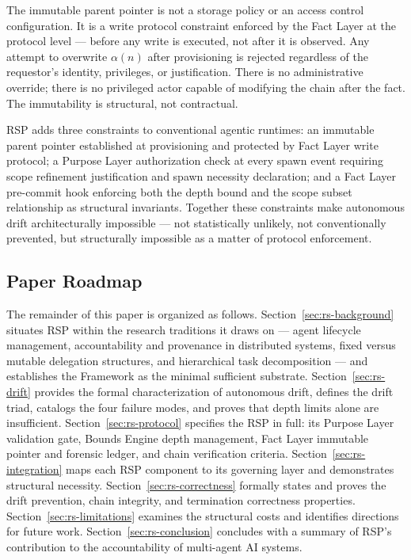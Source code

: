 The immutable parent pointer is not a storage policy or an access control configuration. It is a write protocol constraint enforced by the Fact Layer at the protocol level — before any write is executed, not after it is observed. Any attempt to overwrite $\alpha(n)$ after provisioning is rejected regardless of the requestor's identity, privileges, or justification. There is no administrative override; there is no privileged actor capable of modifying the chain after the fact. The immutability is structural, not contractual.

RSP adds three constraints to conventional agentic runtimes: an immutable parent pointer established at provisioning and protected by Fact Layer write protocol; a Purpose Layer authorization check at every spawn event requiring scope refinement justification and spawn necessity declaration; and a Fact Layer pre-commit hook enforcing both the depth bound and the scope subset relationship as structural invariants. Together these constraints make autonomous drift architecturally impossible — not statistically unlikely, not conventionally prevented, but structurally impossible as a matter of protocol enforcement.

\subsection{Paper Roadmap}

The remainder of this paper is organized as follows. Section~\ref{sec:rs-background} situates RSP within the research traditions it draws on — agent lifecycle management, accountability and provenance in distributed systems, fixed versus mutable delegation structures, and hierarchical task decomposition — and establishes the \bxthree{} Framework as the minimal sufficient substrate. Section~\ref{sec:rs-drift} provides the formal characterization of autonomous drift, defines the drift triad, catalogs the four failure modes, and proves that depth limits alone are insufficient. Section~\ref{sec:rs-protocol} specifies the RSP in full: its Purpose Layer validation gate, Bounds Engine depth management, Fact Layer immutable pointer and forensic ledger, and chain verification criteria. Section~\ref{sec:rs-integration} maps each RSP component to its governing \bxthree{} layer and demonstrates structural necessity. Section~\ref{sec:rs-correctness} formally states and proves the drift prevention, chain integrity, and termination correctness properties. Section~\ref{sec:rs-limitations} examines the structural costs and identifies directions for future work. Section~\ref{sec:rs-conclusion} concludes with a summary of RSP's contribution to the accountability of multi-agent AI systems.